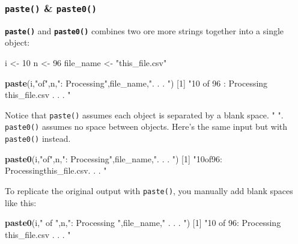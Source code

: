 \documentclass[]{book}
\newenvironment{Shaded}{\begin{snugshade}}{\end{snugshade}}
\newcommand{\DecValTok}[1]{\textcolor[rgb]{0.00,0.00,0.81}{#1}}
\newcommand{\KeywordTok}[1]{\textcolor[rgb]{0.13,0.29,0.53}{\textbf{#1}}}
\newcommand{\NormalTok}[1]{#1}
\newcommand{\StringTok}[1]{\textcolor[rgb]{0.31,0.60,0.02}{#1}}
\begin{document}
\hypertarget{paste-paste0}{%
\subsubsection*{\texorpdfstring{\texttt{paste()} \& \texttt{paste0()}}{paste() \& paste0()}}\label{paste-paste0}}

\textbf{\texttt{paste()}} and \textbf{\texttt{paste0()}} combines two ore more strings together into a single object:

\begin{Shaded}
\begin{Highlighting}[]
\NormalTok{i <-}\StringTok{ }\DecValTok{10}
\NormalTok{n <-}\StringTok{ }\DecValTok{96}
\NormalTok{file_name <-}\StringTok{ "this_file.csv"}

\KeywordTok{paste}\NormalTok{(i,}\StringTok{"of"}\NormalTok{,n,}\StringTok{": Processing"}\NormalTok{,file_name,}\StringTok{". . . "}\NormalTok{)}
\NormalTok{[}\DecValTok{1}\NormalTok{] }\StringTok{"10 of 96 : Processing this_file.csv . . . "}
\end{Highlighting}
\end{Shaded}

Notice that \texttt{paste()} assumes each object is separated by a blank space. " ". \texttt{paste0()} assumes no space between objects. Here's the same input but with \texttt{paste0()} instead.

\begin{Shaded}
\begin{Highlighting}[]
\KeywordTok{paste0}\NormalTok{(i,}\StringTok{"of"}\NormalTok{,n,}\StringTok{": Processing"}\NormalTok{,file_name,}\StringTok{". . . "}\NormalTok{) }
\NormalTok{[}\DecValTok{1}\NormalTok{] }\StringTok{"10of96: Processingthis_file.csv. . . "}
\end{Highlighting}
\end{Shaded}

To replicate the original output with \texttt{paste()}, you manually add blank spaces like this:

\begin{Shaded}
\begin{Highlighting}[]
\KeywordTok{paste0}\NormalTok{(i,}\StringTok{" of "}\NormalTok{,n,}\StringTok{": Processing "}\NormalTok{,file_name,}\StringTok{" . . . "}\NormalTok{) }
\NormalTok{[}\DecValTok{1}\NormalTok{] }\StringTok{"10 of 96: Processing this_file.csv . . . "}
\end{Highlighting}
\end{Shaded}
\end{document}
